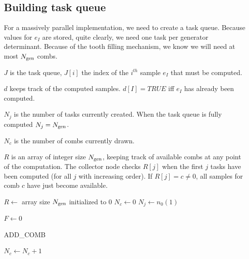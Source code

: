 \documentclass[./thesis.tex]{subfiles}
\begin{document}
\subsection{Building task queue}

For a massively parallel implementation, we need to create a task queue. Because values for $e_I$ are stored, quite clearly, we need one task per generator determinant. Because of the tooth filling mechanism, we know we will need at most ${N_\text{gen}}$ combs.
\begin{description}
\item{$J$} is the task queue, $J[i]$ the index of the $i^{th}$ sample $e_I$ that must be computed.
\item{$d$} keeps track of the computed samples. $d[I] = TRUE$ iff $e_I$ has already been computed.
\item{$N_j$} is the number of tasks currently created. When the task queue is fully computed $N_j = {N_\text{gen}}$.
\item{$N_c$} is the number of combs currently drawn.
\item{$R$} is an array of integer size ${N_\text{gen}}$, keeping track of available combs at any point of the computation. The collector node checks $R[j]$ when the first $j$ tasks have been computed (for all $j$ with increasing order). If $R[j] = c \neq 0$, all samples for comb $c$ have just become available. 
\end{description}



\begin{algorithm}
	$R \gets $ array size ${N_\text{gen}}$ initialized to 0 \;
	$N_c \gets 0$ \;
	$N_j \gets n_0(1)$ \;
	
	
	\For{$i=1,\Ngen$}{
		$u[i] \gets $ random value in $[0,1)_\mathbb{R}$ \;	
	}
	$F \gets 0$ \;	
\end{algorithm}

\begin{algorithm}
	\caption{ADD\_COMB}
	\label{alg:ADD_COMB}
		$N_c \gets N_c + 1$ \;
\end{algorithm}
\end{document}
